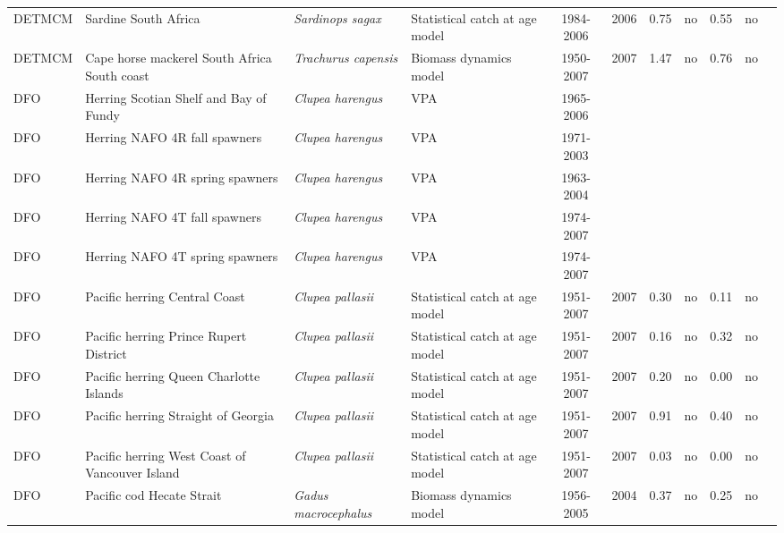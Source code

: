 \begin{longtable}{p{1.8cm}p{3.5cm}p{3.5cm}p{3cm}cccp{0.9cm}cp{0.9cm}c}
  DETMCM & Sardine South Africa & \textit{Sardinops sagax} & Statistical catch at age model & 1984-2006 & 2006 & 0.75 & no & 0.55 & no & \cite{deMoorSASardineAssessment-Sep07.pdf} \\ 
  DETMCM & Cape horse mackerel South Africa South coast & \textit{Trachurus capensis} & Biomass dynamics model & 1950-2007 & 2007 & 1.47 & no & 0.76 & no & \cite{Johnston-SAHorseMackerel-2007.pdf} \\ 
  DFO & Herring Scotian Shelf and Bay of Fundy & \textit{Clupea harengus} & VPA & 1965-2006 &  &  &  &  &  & \cite{NAFO-HERR4VWX-2006.pdf} \\ 
  DFO & Herring NAFO 4R fall spawners & \textit{Clupea harengus} & VPA & 1971-2003 &  &  &  &  &  & \cite{NAFO-HERR4RSP-2004.pdf} \\ 
  DFO & Herring NAFO 4R spring spawners & \textit{Clupea harengus} & VPA & 1963-2004 &  &  &  &  &  & \cite{NAFO-HERR4RSP-2004.pdf} \\ 
  DFO & Herring NAFO 4T fall spawners & \textit{Clupea harengus} & VPA & 1974-2007 &  &  &  &  &  & \cite{NAFO-HERR4TFA-2007.pdf} \\ 
  DFO & Herring NAFO 4T spring spawners & \textit{Clupea harengus} & VPA & 1974-2007 &  &  &  &  &  & \cite{NAFO-HERR4TFA-2007.pdf} \\ 
  DFO & Pacific herring Central Coast & \textit{Clupea pallasii} & Statistical catch at age model & 1951-2007 & 2007 & 0.30 & no & 0.11 & no & \cite{RES2007_002_e.pdf} \\ 
  DFO & Pacific herring Prince Rupert District & \textit{Clupea pallasii} & Statistical catch at age model & 1951-2007 & 2007 & 0.16 & no & 0.32 & no & \cite{RES2007_002_e.pdf} \\ 
  DFO & Pacific herring Queen Charlotte Islands & \textit{Clupea pallasii} & Statistical catch at age model & 1951-2007 & 2007 & 0.20 & no & 0.00 & no & \cite{RES2007_002_e.pdf} \\ 
  DFO & Pacific herring Straight of Georgia & \textit{Clupea pallasii} & Statistical catch at age model & 1951-2007 & 2007 & 0.91 & no & 0.40 & no & \cite{RES2007_002_e.pdf} \\ 
  DFO & Pacific herring West Coast of Vancouver Island & \textit{Clupea pallasii} & Statistical catch at age model & 1951-2007 & 2007 & 0.03 & no & 0.00 & no & \cite{RES2007_002_e.pdf} \\ 
  DFO & Pacific cod Hecate Strait & \textit{Gadus macrocephalus} & Biomass dynamics model & 1956-2005 & 2004 & 0.37 & no & 0.25 & no & \cite{RES2005_026_Cod.pdf} \\ 

\end{longtable}
